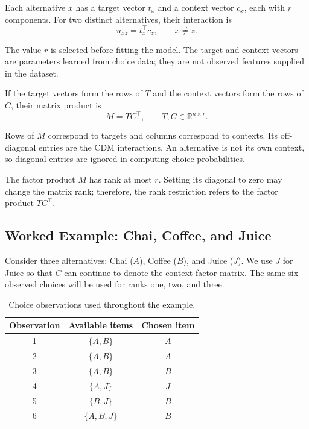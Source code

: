 \documentclass[12pt,oneside]{report}
\newcommand{\R}{\mathbb{R}}
\begin{document}
Each alternative $x$ has a target vector $t_x$ and a context
vector $c_x$, each with $r$ components. For two distinct
alternatives, their interaction is
\begin{equation}
    u_{xz}=t_x^\top c_z,
    \qquad x\neq z.
    \label{eq:low-rank-interaction}
\end{equation}

The value $r$ is selected before fitting the model. The
target and context vectors are parameters learned from choice
data; they are not observed features supplied in the dataset.

If the target vectors form the rows of $T$ and the context
vectors form the rows of $C$, their matrix product is
\begin{equation}
    M=TC^\top,
    \qquad T,C\in\R^{n\times r}.
    \label{eq:low-rank-product}
\end{equation}

Rows of $M$ correspond to targets and columns correspond to
contexts. Its off-diagonal entries are the CDM interactions.
An alternative is not its own context, so diagonal entries
are ignored in computing choice probabilities.

The factor product $M$ has rank at most $r$. Setting its
diagonal to zero may change the matrix rank; therefore, the
rank restriction refers to the factor product $TC^\top$.

\subsection{Worked Example: Chai, Coffee, and Juice}
\label{subsec:low-rank-worked-example}

Consider three alternatives: Chai ($A$), Coffee ($B$), and
Juice ($J$). We use $J$ for Juice so that $C$ can continue
to denote the context-factor matrix. The same six observed
choices will be used for ranks one, two, and three.

\begin{table}[htbp]
    \centering
    \caption{Choice observations used throughout the example.}
    \label{tab:low-rank-example-data}
    \begin{tabular}{ccc}
        \toprule
        Observation & Available items & Chosen item\\
        \midrule
        1 & $\{A,B\}$   & $A$\\
        2 & $\{A,B\}$   & $A$\\
        3 & $\{A,B\}$   & $B$\\
        4 & $\{A,J\}$   & $J$\\
        5 & $\{B,J\}$   & $B$\\
        6 & $\{A,B,J\}$ & $B$\\
        \bottomrule
    \end{tabular}
\end{table}
\end{document}
